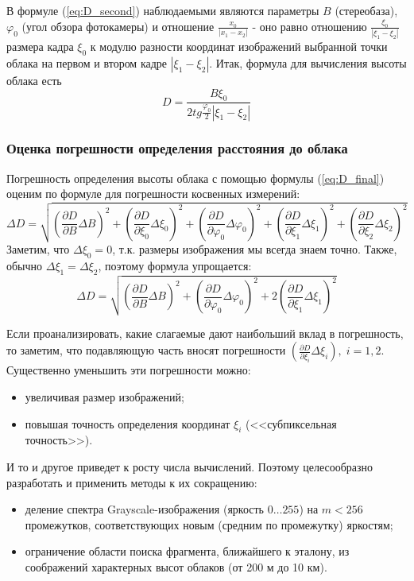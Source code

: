 В формуле (\ref{eq:D_second}) наблюдаемыми являются параметры $B$ (стереобаза), $\varphi_0$ (угол обзора фотокамеры) и отношение $\frac{x_0}{|x_1-x_2|}$ - оно равно отношению $\frac{\xi_0}{|\xi_1 - \xi_2|}$ размера кадра $\xi_0$ к модулю разности координат изображений
выбранной точки облака на первом и втором кадре $|\xi_1 - \xi_2|$. Итак, формула для вычисления высоты облака есть
\begin{equation}\label{eq:D_final}
D = \frac{B\xi_0}{2tg\frac{\varphi_0}{2}|\xi_1 - \xi_2|}
\end{equation}

%
%

\subsubsection{Оценка погрешности определения расстояния до облака}

Погрешность определения высоты облака с помощью формулы (\ref{eq:D_final}) оценим по формуле для погрешности косвенных измерений:
\begin{equation*}
    \Delta D =  \sqrt{ (\frac{\partial D}{\partial B}\Delta B)^2 + (\frac{\partial D}{\partial \xi_0}\Delta \xi_0)^2 + (\frac{\partial D}{\partial \varphi_0}\Delta \varphi_0)^2 + (\frac{\partial D}{\partial \xi_1}\Delta \xi_1)^2 + (\frac{\partial D}{\partial \xi_2}\Delta \xi_2)^2 }
\end{equation*}
Заметим, что $\Delta \xi_0 = 0$, т.к. размеры изображения мы всегда знаем точно. Также, обычно $\Delta \xi_1 = \Delta \xi_2$, поэтому формула упрощается:
\begin{equation*}
    \Delta D =  \sqrt{ (\frac{\partial D}{\partial B}\Delta B)^2 + (\frac{\partial D}{\partial \varphi_0}\Delta \varphi_0)^2 + 2(\frac{\partial D}{\partial \xi_1}\Delta \xi_1)^2}
\end{equation*}

Если проанализировать, какие слагаемые дают наибольший вклад в погрешность, то заметим, что подавляющую часть вносят погрешности  $(\frac{\partial D}{\partial \xi_i}\Delta \xi_i), \; i=1,2.$  Существенно уменьшить эти погрешности можно:
\begin{itemize}
\item увеличивая размер изображений;
\item повышая точность определения координат $\xi_i$ (<<субпиксельная точность>>).
\end{itemize}
И то и другое приведет к росту числа вычислений. Поэтому целесообразно разработать и применить методы к их сокращению:
\begin{itemize}
\item деление спектра Grayscale-изображения (яркость $0 \dots 255$) на $m < 256$ промежутков, соответствующих новым (средним по промежутку) яркостям;
\item ограничение области поиска фрагмента, ближайшего к эталону, из соображений характерных высот облаков (от 200 м до 10 км).
\end{itemize}

